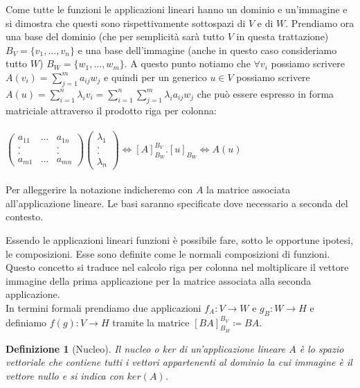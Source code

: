 \documentclass[a4paper,12pt]{report}
\newtheorem{definizione}{Definizione}[chapter]
\begin{document}
 Come tutte le funzioni le applicazioni lineari hanno un dominio e un'immagine e si dimostra che questi sono rispettivamente sottospazi di $V$ e di $W$. Prendiamo ora una base del dominio (che per semplicità sarà tutto $V$ in questa trattazione) $B_V=\{v_1,...,v_n\}$ e una base dell'immagine (anche in questo caso consideriamo tutto $W$) $B_{W}=\{w_1,...,w_m\}$. 
 A questo punto notiamo che $\forall v_i$ possiamo scrivere $\displaystyle A(v_i)=\sum_{j=1}^ma_{ij}w_j$ e quindi per un generico $u \in V$ possiamo scrivere $\displaystyle A(u)=\sum_{i=1}^n \lambda_iv_i=\sum_{i=1}^n\sum_{j=1}^m\lambda_ia_{ij}w_j$ che può essere espresso in forma matriciale attraverso il prodotto riga per colonna:
 \\
 \\ $ \begin{pmatrix} a_{11} &...&a_{1n} \\ . & &. \\. & & . \\ a_{m1} & ...&a_{mn}\end{pmatrix} \begin{pmatrix}
     \lambda_1\\.\\.\\ \lambda_n
 \end{pmatrix} \iff[A]^{B_V}_{B_{W}}.[u]_{B_W} \iff A(u)$
 \\
 \\
 Per alleggerire la notazione indicheremo con $A$ la matrice associata all'applicazione lineare. Le basi saranno specificate dove necessario a seconda del contesto.

Essendo le applicazioni lineari funzioni è possibile fare, sotto le opportune ipotesi, le composizioni. Esse sono definite come le normali composizioni di funzioni. Questo concetto si traduce nel calcolo riga per colonna nel moltiplicare il vettore immagine della prima applicazione per la matrice associata alla seconda applicazione.
\\In termini formali prendiamo due applicazioni $f_A:V \to W$ e $g_B:W \to H$ e definiamo $f(g):V \to H$ tramite la matrice $[BA]^{B_{V}}_{B_H} \coloneqq BA$.


\begin{definizione}[Nucleo]
    Il nucleo o ker di un'applicazione lineare $A$ è lo spazio vettoriale che contiene tutti i vettori appartenenti al dominio la cui immagine è il vettore nullo e si indica con $ker(A)$.
\end{definizione}
\end{document}
